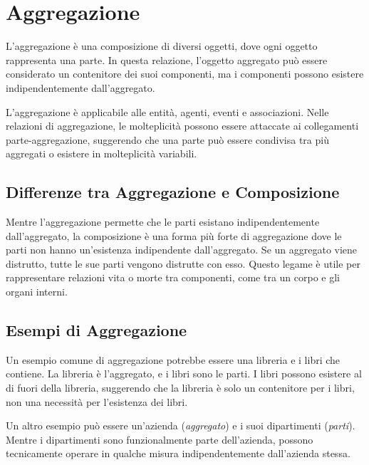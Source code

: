 \section{Aggregazione}
\begin{tcolorbox}[colback=teal!5!white,colframe=teal!75!black, title=Aggregazione]
    L'aggregazione è una composizione di diversi oggetti, dove ogni oggetto rappresenta una 
    parte. In questa relazione, l'oggetto aggregato può essere considerato un contenitore
    dei suoi componenti, ma i componenti possono esistere indipendentemente dall'aggregato.
\end{tcolorbox}
L'aggregazione è applicabile alle entità, agenti, eventi e associazioni.
Nelle relazioni di aggregazione, le molteplicità possono essere attaccate ai
collegamenti parte-aggregazione, suggerendo che una parte può essere condivisa
tra più aggregati o esistere in molteplicità variabili.
\begin{figure}[H]
    \centering
\end{figure}

\subsection{Differenze tra Aggregazione e Composizione}
Mentre l'aggregazione permette che le parti esistano indipendentemente dall'aggregato,
la composizione è una forma più forte di aggregazione dove le parti non hanno
un'esistenza indipendente dall'aggregato. Se un aggregato viene distrutto, tutte
le sue parti vengono distrutte con esso. Questo legame è utile per rappresentare
relazioni vita o morte tra componenti, come tra un corpo e gli organi interni.

\subsection{Esempi di Aggregazione}
Un esempio comune di aggregazione potrebbe essere una libreria e i libri che
contiene. La libreria è l'aggregato, e i libri sono le parti. I libri possono
esistere al di fuori della libreria, suggerendo che la libreria è solo un
contenitore per i libri, non una necessità per l'esistenza dei libri.

Un altro esempio può essere un'azienda (\textit{aggregato}) e i suoi dipartimenti (\textit{parti}).
Mentre i dipartimenti sono funzionalmente parte dell'azienda, possono tecnicamente
operare in qualche misura indipendentemente dall'azienda stessa.
